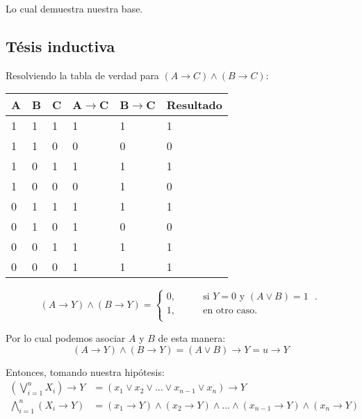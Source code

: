 \documentclass[11pt]{utalcaDoc}
\numberwithin{equation}{section}
\begin{document}
Lo cual demuestra nuestra base.


\subsection{Tésis inductiva}


Resolviendo la tabla de verdad para $(A \rightarrow C) \wedge (B \rightarrow C)$:\\
\begin{center}
\begin{tabular}{| l | l | l | l | l | l |}
	A	&B	&C	&A$\rightarrow$C	&B$\rightarrow$C	&Resultado\\
	\hline
	1       &1       &1       &1       &1       &1\\
	1       &1       &0       &0       &0       &0\\
	1       &0       &1       &1       &1       &1\\
	1       &0       &0       &0       &1       &0\\
	0       &1       &1       &1       &1       &1\\
	0       &1       &0       &1       &0       &0\\
	0       &0       &1       &1       &1       &1\\
	0       &0       &0       &1       &1       &1\\
\end{tabular}
\end{center}


\[ (A \rightarrow Y) \wedge (B \rightarrow Y) =
 \begin{cases}
 0, 	\qquad& \text{si $Y=0$ y $(A\vee B) = 1$ }.\\
 1,	 	\qquad& \text{en otro caso}.\\
\end{cases} \]

Por lo cual podemos asociar $A$ y $B$ de esta manera:
\begin{equation}
(A \rightarrow Y) \wedge (B \rightarrow Y) = (A\vee B) \rightarrow Y = u \rightarrow Y
\end{equation}\label{EQ:ANDATORIA_PROPIEDAD_1}

Entonces, tomando nuestra hipótesis:
\begin{align}
\left(\bigvee\limits_{i=1}^{n}X_i\right)\rightarrow Y &= (x_1\vee x_2\vee \ldots \vee x_{n-1} \vee x_n)\rightarrow Y\label{EQ:ORATORIA_TI_1}\\
\bigwedge\limits_{i=1}^{n}(X_i\rightarrow Y) &= (x_1\rightarrow Y) \wedge (x_2\rightarrow Y) \wedge \ldots \wedge (x_{n-1}\rightarrow Y) \wedge (x_n\rightarrow Y) \label{EQ:ANDATORIA_TI_1}
\end{align}
\end{document}
